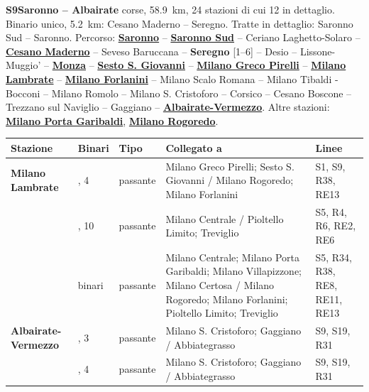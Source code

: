 \medskip\noindent\hypertarget{lin:S9}{\textbf{S9\enspace Saronno -- Albairate}} corse, \SI{58,9}{\km}, 24 stazioni di cui 12 in dettaglio. Binario unico, \SI{5,2}{\km}: Cesano Maderno -- Seregno. Tratte in dettaglio: Saronno Sud -- Saronno. Percorso: \hyperlink{sta:S01933}{\textbf{Saronno}} -- \hyperlink{sta:S01077}{\textbf{Saronno Sud}} -- Ceriano Laghetto-Solaro -- \hyperlink{sta:S01086}{\textbf{Cesano Maderno}} -- Seveso Baruccana -- \hypertarget{sta:S01318}{\textbf{Seregno}} [1--6] -- Desio -- Lissone-Muggio' -- \hyperlink{sta:S01322}{\textbf{Monza}} -- \hyperlink{sta:S01325}{\textbf{Sesto S. Giovanni}} -- \hyperlink{sta:S01326}{\textbf{Milano Greco Pirelli}} -- \hyperlink{sta:S01701}{\textbf{Milano Lambrate}} -- \hyperlink{sta:S01492}{\textbf{Milano Forlanini}} -- Milano Scalo Romana -- Milano Tibaldi - Bocconi -- Milano Romolo -- Milano S. Cristoforo -- Corsico -- Cesano Boscone -- Trezzano sul Naviglio -- Gaggiano -- \hyperlink{sta:S01059}{\textbf{Albairate-Vermezzo}}. Altre stazioni: \hyperlink{sta:S01645}{\textbf{Milano Porta Garibaldi}}, \hyperlink{sta:S01820}{\textbf{Milano Rogoredo}}.
{\footnotesize\setlength{\LTpre}{2pt}\setlength{\LTpost}{0pt}
\begin{longtable}{@{}>{\raggedright\arraybackslash}p{}>{\raggedright\arraybackslash}p{}>{\raggedright\arraybackslash}p{}>{\raggedright\arraybackslash}p{}>{\raggedright\arraybackslash}p{}@{}}
\toprule
Stazione & Binari & Tipo & Collegato a & Linee \\
\midrule
\endhead
\leavevmode\hypertarget{sta:S01701}{}\textbf{Milano Lambrate} & 3, 4 & passante & Milano Greco Pirelli; Sesto S. Giovanni / Milano Rogoredo; Milano Forlanini & S1, S9, R38, RE13 \\
 & 9, 10 & passante & Milano Centrale / Pioltello Limito; Treviglio & S5, R4, R6, RE2, RE6 \\
 & 6 binari & passante & Milano Centrale; Milano Porta Garibaldi; Milano Villapizzone; Milano Certosa / Milano Rogoredo; Milano Forlanini; Pioltello Limito; Treviglio & S5, R34, R38, RE8, RE11, RE13 \\
\leavevmode\hypertarget{sta:S01059}{}\textbf{Albairate-Vermezzo} & 1, 3 & passante & Milano S. Cristoforo; Gaggiano / Abbiategrasso & S9, S19, R31 \\
 & 2, 4 & passante & Milano S. Cristoforo; Gaggiano / Abbiategrasso & S9, S19, R31 \\
\bottomrule
\end{longtable}}

